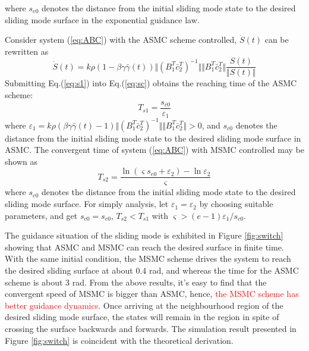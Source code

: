 \documentclass[3p]{elsarticle}
\theoremstyle{plain}
\begin{document}
where $s_{e0}$ denotes the distance from the initial sliding mode state to the desired sliding mode surface in the exponential guidance law.\par
Consider system (\ref{eq:ABC}) with the ASMC scheme controlled, $\dot{S}(t)$ can be rewritten as
\begin{equation}
\dot{S}(t)= k\rho(1-\beta\gamma\bar{\gamma}(t))\Vert(B_1^T\bar{c}^T_2)^{-1}\Vert \Vert B^T_1\bar{c}_2^T\Vert \frac{S(t)}{\Vert S(t)\Vert}\label{eq:s1}
\end{equation}
Submitting Eq.(\ref{eq:s1}) into Eq.(\ref{eq:sc}) obtains the reaching time of the ASMC scheme:
\begin{equation}
T_{s1} = \frac{s_{c0}}{\varepsilon_1}
\end{equation}
where $\varepsilon_1 = k\rho(\beta\gamma\bar{\gamma}(t)-1)\Vert(B_1^T\bar{c}^T_2)^{-1}\Vert \Vert B^T_1\bar{c}_2^T\Vert > 0$, and $s_{c0}$ denotes the distance from the initial sliding mode state to the desired sliding mode surface in ASMC. The convergent time of system (\ref{eq:ABC}) with MSMC controlled may be shown as
\begin{equation}
T_{s2} = \frac{\ln (\varsigma s_{e0}+\varepsilon_2)-\ln\varepsilon_2}{\varsigma}
\end{equation}
where $s_{e0}$ denotes the distance from the initial sliding mode state to the desired sliding mode surface. For simply analysis, let $\varepsilon_1 = \varepsilon_2$ by choosing suitable parameters,  and get $s_{c0}=s_{e0}$, $T_{s2}<T_{s1}$ with $\varsigma>(e-1)\varepsilon_1/s_{c0}$.\par
The guidance situation of the sliding mode is exhibited in Figure \ref{fig:switch} showing that ASMC and MSMC can reach the desired surface in finite time. With the same initial condition, the MSMC scheme drives the system to reach the desired sliding surface at about 0.4 rad, and whereas the time for the ASMC scheme is about 3 rad. From the above results, it's easy to find that the convergent speed of MSMC is bigger than ASMC, hence, \textcolor{red}{the MSMC scheme has better guidance dynamics.} Once arriving at the neighbourhood region of the desired sliding mode surface, the states will remain in the region in spite of crossing the surface backwards and forwards. The simulation result presented in Figure \ref{fig:switch} is coincident with the theoretical derivation.\par
\end{document}

